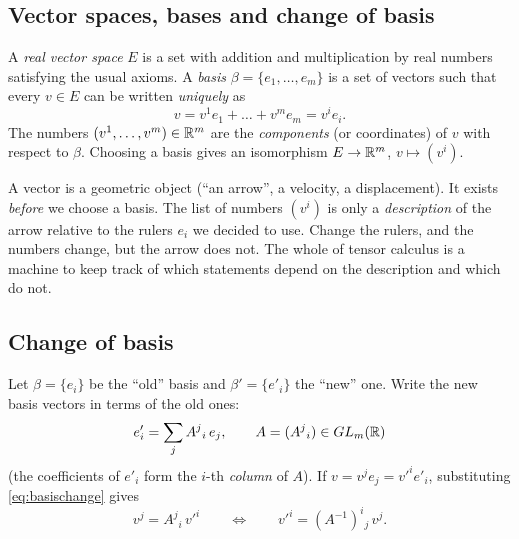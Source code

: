 \subsection{Vector spaces, bases and change of basis}\label{sec:vs}


\begin{formal}
A \emph{real vector space} $E$ is a set with addition and multiplication by real numbers satisfying the usual axioms. A \emph{basis} $\beta=\{e_1,\dots,e_m\}$ is a set of vectors such that every $v\in E$ can be written \emph{uniquely} as
\[
v=v^1e_1+\dots+v^me_m = v^ie_i .
\]
The numbers $(v^1,\dots,v^m)\in\mathbb{R}^m$ are the \emph{components} (or coordinates) of $v$ with respect to $\beta$. Choosing a basis gives an isomorphism $E\to\mathbb{R}^m$, $v\mapsto (v^i)$.
\end{formal}

\begin{intuition}
A vector is a geometric object (``an arrow'', a velocity, a displacement). It exists \emph{before} we choose a basis. The list of numbers $(v^i)$ is only a \emph{description} of the arrow relative to the rulers $e_i$ we decided to use. Change the rulers, and the numbers change, but the arrow does not. The whole of tensor calculus is a machine to keep track of which statements depend on the description and which do not.
\end{intuition}

\subsection*{Change of basis}
Let $\beta=\{e_i\}$ be the ``old'' basis and $\beta'=\{e'_i\}$ the ``new'' one. Write the new basis vectors in terms of the old ones:
\begin{equation}\label{eq:basischange}
e'_i=\sum_j A^j{}_i\, e_j ,\qquad A=(A^j{}_i)\in GL_m(\mathbb{R})
\end{equation}
(the coefficients of $e'_i$ form the $i$-th \emph{column} of $A$). If $v=v^je_j=v'^ie'_i$, substituting \eqref{eq:basischange} gives
\begin{equation}\label{eq:compchange}
v^j=A^j{}_i\,v'^i\qquad\Longleftrightarrow\qquad v'^i=(A^{-1})^i{}_j\,v^j .
\end{equation}

